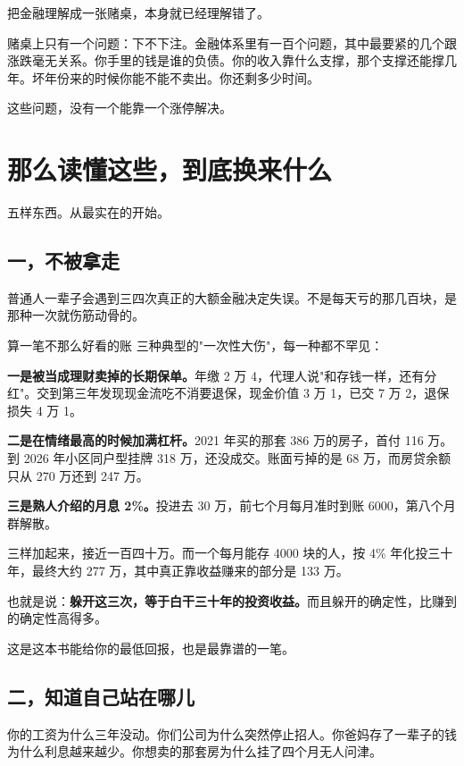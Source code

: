 把金融理解成一张赌桌，本身就已经理解错了。

赌桌上只有一个问题：下不下注。金融体系里有一百个问题，其中最要紧的几个跟涨跌毫无关系。你手里的钱是谁的负债。你的收入靠什么支撑，那个支撑还能撑几年。坏年份来的时候你能不能不卖出。你还剩多少时间。

这些问题，没有一个能靠一个涨停解决。

\bookbreak

\section{那么读懂这些，到底换来什么}

五样东西。从最实在的开始。

\subsection{一，不被拿走}

普通人一辈子会遇到三四次真正的大额金融决定失误。不是每天亏的那几百块，是那种一次就伤筋动骨的。

\begin{egbox}{算一笔不那么好看的账}
三种典型的"一次性大伤"，每一种都不罕见：

\textbf{一是被当成理财卖掉的长期保单。}年缴 2 万 4，代理人说"和存钱一样，还有分红"。交到第三年发现现金流吃不消要退保，现金价值 3 万 1，已交 7 万 2，退保损失 4 万 1。

\textbf{二是在情绪最高的时候加满杠杆。}2021 年买的那套 386 万的房子，首付 116 万。到 2026 年小区同户型挂牌 318 万，还没成交。账面亏掉的是 68 万，而房贷余额只从 270 万还到 247 万。

\textbf{三是熟人介绍的月息 2\%。}投进去 30 万，前七个月每月准时到账 6000，第八个月群解散。

三样加起来，接近一百四十万。而一个每月能存 4000 块的人，按 4\% 年化投三十年，最终大约 277 万，其中真正靠收益赚来的部分是 133 万。

也就是说：\textbf{躲开这三次，等于白干三十年的投资收益。}而且躲开的确定性，比赚到的确定性高得多。

\end{egbox}

这是这本书能给你的最低回报，也是最靠谱的一笔。

\subsection{二，知道自己站在哪儿}

你的工资为什么三年没动。你们公司为什么突然停止招人。你爸妈存了一辈子的钱为什么利息越来越少。你想卖的那套房为什么挂了四个月无人问津。

